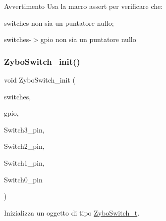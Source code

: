 \begin{DoxyWarning}{Avvertimento}
Usa la macro assert per verificare che\+:
\begin{DoxyItemize}
\item switches non sia un puntatore nullo;
\item switches-\/$>$gpio non sia un puntatore nullo 
\end{DoxyItemize}
\end{DoxyWarning}
\mbox{\label{group___switch_ga59108e526347f01f584bf1d6308a126f}} 
\subsubsection{\texorpdfstring{Zybo\+Switch\+\_\+init()}{ZyboSwitch\_init()}}
{\footnotesize\ttfamily void Zybo\+Switch\+\_\+init (\begin{DoxyParamCaption}\item[{\hyperlink{struct_zybo_switch__t}{Zybo\+Switch\+\_\+t} $\ast$}]{switches,  }\item[{\hyperlink{structmy_g_p_i_o__t}{my\+G\+P\+I\+O\+\_\+t} $\ast$}]{gpio,  }\item[{\hyperlink{group__bare-metal_ga402a0d20afc0cb7c25554b8b023f4253}{my\+G\+P\+I\+O\+\_\+mask}}]{Switch3\+\_\+pin,  }\item[{\hyperlink{group__bare-metal_ga402a0d20afc0cb7c25554b8b023f4253}{my\+G\+P\+I\+O\+\_\+mask}}]{Switch2\+\_\+pin,  }\item[{\hyperlink{group__bare-metal_ga402a0d20afc0cb7c25554b8b023f4253}{my\+G\+P\+I\+O\+\_\+mask}}]{Switch1\+\_\+pin,  }\item[{\hyperlink{group__bare-metal_ga402a0d20afc0cb7c25554b8b023f4253}{my\+G\+P\+I\+O\+\_\+mask}}]{Switch0\+\_\+pin }\end{DoxyParamCaption})}



Inizializza un oggetto di tipo \hyperlink{struct_zybo_switch__t}{Zybo\+Switch\+\_\+t}. 


